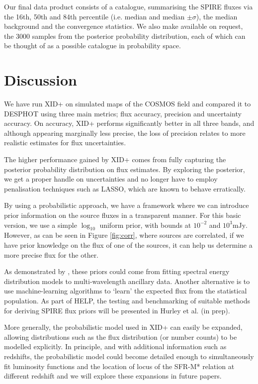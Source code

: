 \documentclass[useAMS,usenatbib]{mnras}
\begin{document}
Our final data product consists of a catalogue, summarising the SPIRE fluxes via the 16th, 50th and 84th percentile (i.e. median and median $\pm \sigma$), the median background and the convergence statistics. We also make available on request, the 3000 samples from the posterior probability distribution, each of which can be thought of as a possible catalogue in probability space.

\section{Discussion}\label{sec:disc}
We have run \textsc{XID+} on simulated maps of the COSMOS field and compared it to \textsc{DESPHOT} using three main metrics; flux accuracy, precision and uncertainty accuracy. On accuracy, \textsc{XID+} performs significantly better in all three bands, and although appearing  marginally less precise, the loss of precision relates to more realistic estimates for flux uncertainties. 

The higher performance gained by \textsc{XID+} comes from fully capturing the posterior probability distribution on flux estimates. By exploring the posterior, we get a proper handle on uncertainties and no longer have to employ penalisation techniques such as LASSO, which are known to behave erratically.

By using a probabilistic approach, we have a framework where we can introduce prior information on the source fluxes in a transparent manner. For this basic version, we use a simple $\log_{10}$ uniform prior, with bounds at $10^{-2}$ and $10^{3}\mathrm{mJy}$. However, as can be seen in Figure \ref{fig:corr}, where sources are correlated, if we have prior knowledge on the flux of one of the sources, it can help us determine a more precise flux for the other.

As demonstrated by \cite{Safarzadeh:2015}, these priors could come from fitting spectral energy distribution models to multi-wavelength ancillary data. Another alternative is to use machine-learning algorithms to `learn' the expected flux from the statistical population. As part of HELP, the testing and benchmarking of suitable methods for deriving SPIRE flux priors will be presented in Hurley et al. (in prep). 

More generally, the probabilistic model used in \textsc{XID+} can easily be expanded, allowing distributions such as the flux distribution (or number counts) to be modelled explicitly. In principle, and with additional information such as redshifts, the probabilistic model could become detailed enough to simultaneously fit luminosity functions and the location of locus of the SFR-M* relation at different redshift and we will explore these expansions in future papers.
\end{document}
